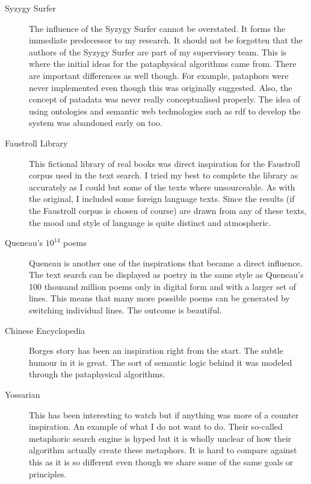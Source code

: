\begin{description}
  \item[Syzygy Surfer] The influence of the Syzygy Surfer cannot be overstated. It forms the immediate predecessor to my research. It should not be forgotten that the authors of the Syzygy Surfer are part of my supervisory team. This is where the initial ideas for the pataphysical algorithms came from. There are important differences as well though. For example, pataphors were never implemented even though this was originally suggested. Also, the concept of patadata was never really conceptualised properly. The idea of using ontologies and semantic web technologies such as \gls{rdf} to develop the system was abandoned early on too.
  \item[Faustroll Library] This fictional library of real books was direct inspiration for the Faustroll corpus used in the text search. I tried my best to complete the library as accurately as I could but some of the texts where unsourceable. As with the original, I included some foreign language texts. Since the results (if the Faustroll corpus is chosen of course) are drawn from any of these texts, the mood and style of language is quite distinct and atmospheric.
  \item[Queneau's $10^{14}$ poems] Queneau is another one of the inspirations that became a direct influence. The text search can be displayed as poetry in the same style as Queneau's 100 thousand million poems only in digital form and with a larger set of lines. This means that many more possible poems can be generated by switching individual lines. The outcome is beautiful.
  \item[Chinese Encyclopedia] Borges story has been an inspiration right from the start. The subtle humour in it is great. The sort of semantic logic behind it was modeled through the pataphysical algorithms.
  \item[Yossarian] This has been interesting to watch but if anything was more of a counter inspiration. An example of what I do not want to do. Their so-called metaphoric search engine is hyped but it is wholly unclear of how their algorithm actually create these metaphors. It is hard to compare against this as it is so different even though we share some of the same goals or principles.

\end{description}
